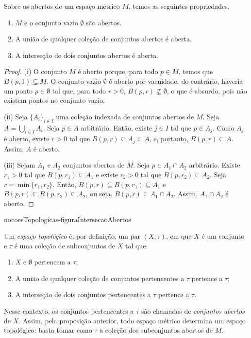 \begin{proposition}
    Sobre os abertos de um espaço métrico $M$, temos as seguintes propriedades.
    \begin{enumerate}[label=(\roman*)]
        \item $M$ e o conjunto vazio $\emptyset$ são abertos.
        \item A união de qualquer coleção de conjuntos abertos é aberta.
        \item A interseção de dois conjuntos abertos é aberta.
    \end{enumerate}
\end{proposition}
\begin{proof}
    (i) O conjunto $M$ é aberto porque, para todo $p \in M$, temos que $B(p, 1) \subseteq M$.
    O conjunto vazio $\emptyset$ é aberto por vacuidade: do contrário, haveria um ponto $p \in \emptyset$ tal que, para todo $r>0$, $B(p, r)\not\subseteq \emptyset$, o que é absurdo, pois não existem pontos no conjunto vazio.

    (ii) Seja $\{A_i\}_{i \in I}$ uma coleção indexada de conjuntos abertos de $M$.
    Seja $A = \bigcup_{i \in I} A_i$.
    Seja $p \in A$ arbitrário.
    Então, existe $j \in I$ tal que $p \in A_j$.
    Como $A_j$ é aberto, existe $r>0$ tal que $B(p, r) \subseteq A_j\subseteq A$, e, portanto, $B(p, r) \subseteq A$.
    Assim, $A$ é aberto.

    (iii) Sejam $A_1$ e $A_2$ conjuntos abertos de $M$.
    Seja $p \in A_1\cap A_2$ arbitrário.
    Existe $r_1>0$ tal que $B(p, r_1) \subseteq A_1$ e existe $r_2>0$ tal que $B(p, r_2) \subseteq A_2$.
    Seja $r = \min\{r_1, r_2\}$.
    Então, $B(p, r) \subseteq B(p, r_1) \subseteq A_1$ e $B(p, r) \subseteq B(p, r_2) \subseteq A_2$, ou seja, $B(p, r) \subseteq A_1\cap A_2$.
    Assim, $A_1\cap A_2$ é aberto.
\end{proof}
{nocoesTopologicas-figuraIntersecaoAbertos}

\begin{knowMore}
    Um \emph{espaço topológico} é, por definição, um par $(X, \tau)$, em que $X$ é um conjunto e $\tau$ é uma coleção de subconjuntos de $X$ tal que:
    \begin{enumerate}[label=(\roman*)]
        \item $X$ e $\emptyset$ pertencem a $\tau$;
        \item A união de qualquer coleção de conjuntos pertencentes a $\tau$ pertence a $\tau$;
        \item A interseção de dois conjuntos pertencentes a $\tau$ pertence a $\tau$.
    \end{enumerate}
    Nesse contexto, os conjuntos pertencentes a $\tau$ são chamados de \emph{conjuntos abertos} de $X$.
    Assim, pela proposição anterior, todo espaço métrico determina um espaço topológico: basta tomar como $\tau$ a coleção dos subconjuntos abertos de $M$.
\end{knowMore}

